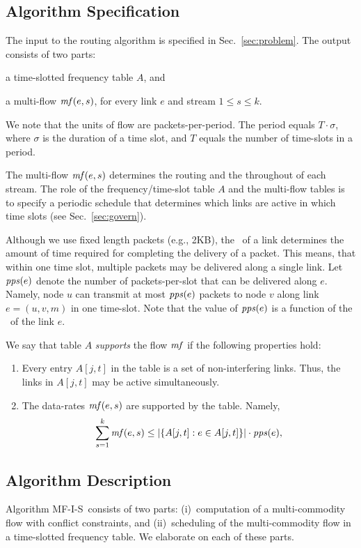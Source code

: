 \documentclass[12pt]{article}
\newenvironment{proof sketch}[1]{\noindent {\emph{Proof sketch of #1:}}}{\hfill \qed}
\newcommand{\pps}{\text{\emph{pps}}}
\newcommand{\mf}{\text{\emph{mf}}}
\newcommand{\MCS}{\text{\sc{mcs}}}
\newcommand{\algA}{\textsc{MF-I-S}}
\begin{document}
\subsection{Algorithm Specification}
The input to the routing algorithm is specified in
Sec.~\ref{sec:problem}.
The output consists of two parts:
\begin{inparaenum}[(i)]
\item a time-slotted frequency table $A$, and
\item a multi-flow $\mf(e,s)$, for every link $e$ and stream $1\leq
  s\leq k$.
\end{inparaenum}
We note that the units of flow are packets-per-period. The period
equals $T \cdot \sigma$, where $\sigma$ is the duration of a time
slot, and $T$ equals the number of time-slots in a period.

The multi-flow $\mf(e,s)$ determines the routing and the throughout of
each stream. The role of the frequency/time-slot table $A$ and the
multi-flow tables is to specify a periodic schedule that determines
which links are active in which time slots (see Sec.~\ref{sec:govern}).

Although we use fixed length packets (e.g., 2KB), the \MCS\ of a link
determines the amount of time required for completing the delivery of
a packet.  This means, that within one time slot, multiple packets may
be delivered along a single link.  Let $\pps(e)$ denote the number of
packets-per-slot that can be delivered along $e$.  Namely, node $u$
can transmit at most $\pps(e)$ packets to node $v$ along link
$e=(u,v,m)$ in one time-slot. Note that the value of $\pps(e)$ is a function of
the \MCS\ of the link $e$.

\medskip \noindent We say that table $A$ \emph{supports} the flow
$\mf$ if the following properties hold:
\begin{enumerate}
\item Every entry $A[j,t]$ in the table is a set of non-interfering
  links. Thus, the links in $A[j,t]$
  may be active simultaneously.
\item The data-rates $\mf(e,s)$ are supported by the table. Namely,
  \begin{align}\label{eq:support}
    \sum_{s=1}^k \mf(e,s) \leq |\{A[j,t] : e\in A[j,t]\}|\cdot \pps(e),
  \end{align}
\end{enumerate}

\subsection{Algorithm Description} \label{sec:sched}
Algorithm \algA\ consists of two parts: (i)~computation of a
multi-commodity flow with conflict constraints, and (ii)~scheduling of
the multi-commodity flow in a time-slotted frequency table.
We elaborate on each of these parts.
\end{document}
